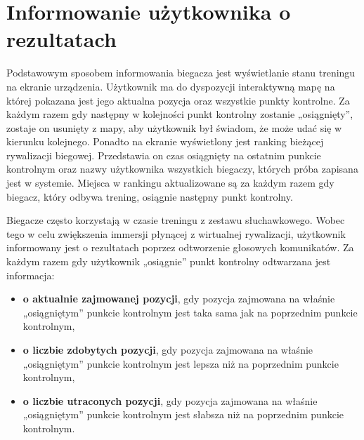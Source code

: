 \section{Informowanie użytkownika o rezultatach}\label{chap:zasada-tts}
Podstawowym sposobem informowania biegacza jest wyświetlanie stanu treningu na ekranie urządzenia. Użytkownik ma do dyspozycji interaktywną mapę na której pokazana jest jego aktualna pozycja oraz wszystkie punkty kontrolne. Za każdym razem gdy następny w kolejności punkt kontrolny zostanie „osiągnięty”, zostaje on usunięty z mapy, aby użytkownik był świadom, że może udać się w kierunku kolejnego. Ponadto na ekranie wyświetlony jest ranking bieżącej rywalizacji biegowej. Przedstawia on czas osiągnięty na ostatnim punkcie kontrolnym oraz nazwy użytkownika wszystkich biegaczy, których próba zapisana jest w systemie. Miejsca w rankingu aktualizowane są za każdym razem gdy biegacz, który odbywa trening, osiągnie następny punkt kontrolny.

Biegacze często korzystają w czasie treningu z zestawu słuchawkowego. Wobec tego w celu zwiększenia immersji płynącej z wirtualnej rywalizacji, użytkownik informowany jest o rezultatach poprzez odtworzenie głosowych komunikatów. Za każdym razem gdy użytkownik „osiągnie” punkt kontrolny odtwarzana jest informacja:
\begin{itemize}
\item{\textbf{o aktualnie zajmowanej pozycji}, gdy pozycja zajmowana na właśnie „osiągniętym” punkcie kontrolnym jest taka sama jak na poprzednim punkcie kontrolnym},
\item{\textbf{o liczbie zdobytych pozycji}, gdy pozycja zajmowana na właśnie „osiągniętym” punkcie kontrolnym jest lepsza niż na poprzednim punkcie kontrolnym},
\item{\textbf{o liczbie utraconych pozycji}, gdy pozycja zajmowana na właśnie „osiągniętym” punkcie kontrolnym jest słabsza niż na poprzednim punkcie kontrolnym}.
\end{itemize}